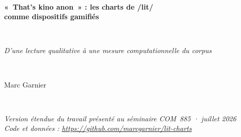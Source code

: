 \documentclass[11pt,a4paper]{article}
\begin{document}
\thispagestyle{fancy}

\begin{center}
{\footnotesize\sffamily\color{gray}}\\[1.4em]
{\LARGE\bfseries «~That's kino anon~» : les charts de /lit/\\comme dispositifs gamifiés\par}\\[0.5em]
{\large\itshape D'une lecture qualitative à une mesure computationnelle du corpus\par}\\[1em]
{\large Marc Garnier\par}\\[0.3em]
{\footnotesize\itshape Version étendue du travail présenté au séminaire COM~885 · juillet 2026\\
Code et données : \url{https://github.com/marcgarnier/lit-charts}\par}
\end{center}
\vspace{0.8em}
\end{document}
